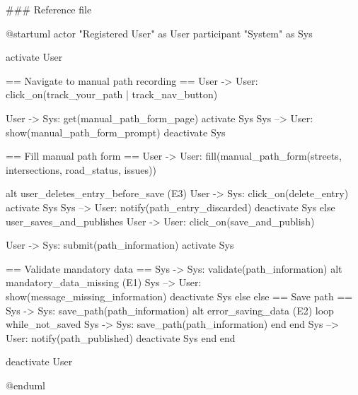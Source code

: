 ### Reference file


@startuml
actor "Registered User" as User
participant "System" as Sys

activate User


== Navigate to manual path recording ==
User -> User: click_on(track_your_path | track_nav_button)

User -> Sys: get(manual_path_form_page)
activate Sys
Sys --> User: show(manual_path_form_prompt)
deactivate Sys

== Fill manual path form ==
User -> User: fill(manual_path_form(streets, intersections, road_status, issues))

alt user_deletes_entry_before_save (E3)  
    User -> Sys: click_on(delete_entry)
    activate Sys
    Sys --> User: notify(path_entry_discarded)
    deactivate Sys
else user_saves_and_publishes
    User -> User: click_on(save_and_publish)

    User -> Sys: submit(path_information)
    activate Sys

    == Validate mandatory data ==
    Sys -> Sys: validate(path_information)
    alt mandatory_data_missing (E1)
        Sys --> User: show(message_missing_information)
        deactivate Sys
    else else
        == Save path ==
        Sys -> Sys: save_path(path_information)
        alt error_saving_data (E2)
            loop while_not_saved
               Sys -> Sys: save_path(path_information)
            end
        end
        Sys --> User: notify(path_published)
        deactivate Sys
    end
end

deactivate User

@enduml
